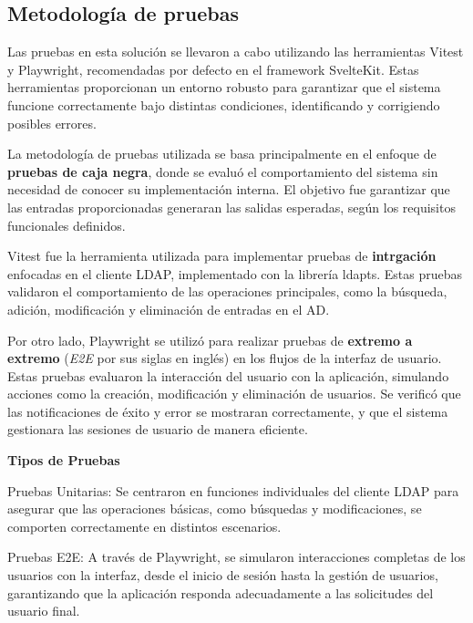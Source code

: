 \subsection{Metodología de pruebas}

Las pruebas en esta solución se llevaron a cabo utilizando las herramientas Vitest y Playwright, recomendadas por defecto en el framework SvelteKit. Estas herramientas proporcionan un entorno robusto para garantizar que el sistema funcione correctamente bajo distintas condiciones, identificando y corrigiendo posibles errores.

La metodología de pruebas utilizada se basa principalmente en el enfoque de \textbf{pruebas de caja negra}, donde se evaluó el comportamiento del sistema sin necesidad de conocer su implementación interna. El objetivo fue garantizar que las entradas proporcionadas generaran las salidas esperadas, según los requisitos funcionales definidos.

Vitest fue la herramienta utilizada para implementar pruebas de \textbf{intrgación} enfocadas en el cliente LDAP, implementado con la librería ldapts. Estas pruebas validaron el comportamiento de las operaciones principales, como la búsqueda, adición, modificación y eliminación de entradas en el AD.

Por otro lado, Playwright se utilizó para realizar pruebas de \textbf{extremo a extremo} (\textit{E2E} por sus siglas en inglés) en los flujos de la interfaz de usuario. Estas pruebas evaluaron la interacción del usuario con la aplicación, simulando acciones como la creación, modificación y eliminación de usuarios. Se verificó que las notificaciones de éxito y error se mostraran correctamente, y que el sistema gestionara las sesiones de usuario de manera eficiente.

\textbf{Tipos de Pruebas}

Pruebas Unitarias: Se centraron en funciones individuales del cliente LDAP para asegurar que las operaciones básicas, como búsquedas y modificaciones, se comporten correctamente en distintos escenarios.

Pruebas E2E: A través de Playwright, se simularon interacciones completas de los usuarios con la interfaz, desde el inicio de sesión hasta la gestión de usuarios, garantizando que la aplicación responda adecuadamente a las solicitudes del usuario final.
